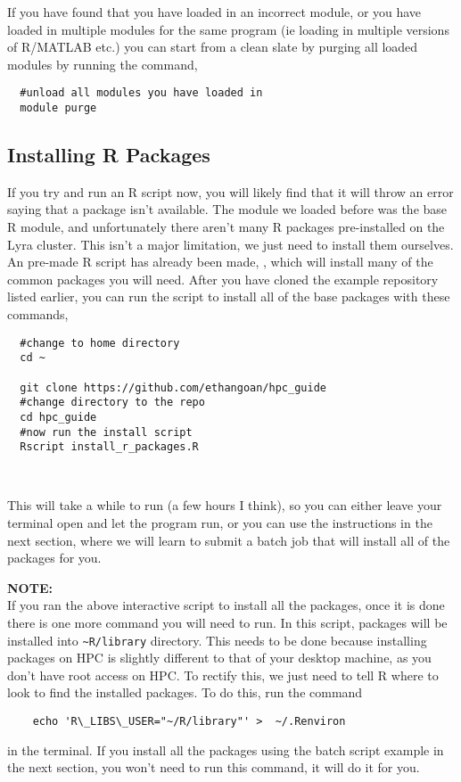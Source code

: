 If you have found that you have loaded in an incorrect module, or you have loaded in multiple modules for the same program (ie loading in multiple versions of R/MATLAB etc.) you can start from a clean slate by purging all loaded modules by running the command,
%
\\
\par
\begin{verbatim}
  #unload all modules you have loaded in
  module purge
\end{verbatim}
% 
\subsection{Installing R Packages}
\label{sec:install}
If you try and run an R script now, you will likely find that it will throw an error saying that a package isn't available. The module we loaded before was the base R module, and unfortunately there aren't many R packages pre-installed on the Lyra cluster. This isn't a major limitation, we just need to install them ourselves. An pre-made R script has already been made, , which will install many of the common packages you will need. After you have cloned the example repository listed earlier, you can run the script to install all of the base packages with these commands,
\\
\par
\begin{verbatim}
  #change to home directory
  cd ~
  
  git clone https://github.com/ethangoan/hpc_guide  
  #change directory to the repo
  cd hpc_guide
  #now run the install script
  Rscript install_r_packages.R
\end{verbatim}
%
\\
\par
% 
This will take a while to run (a few hours I think), so you can either leave your terminal open and let the program run, or you can use the instructions in the next section, where we will learn to submit a batch job that will install all of the packages for you.
%
%
\begin{story}
  \textbf{NOTE:}
  \\
  If you ran the above interactive script to install all the packages, once it is done there is one more command you will need to run. In this script, packages will be installed into \texttt{\textasciitilde R/library} directory. This needs to be done because installing packages on HPC is slightly different to that of your desktop machine, as you don't have root access on HPC. To rectify this, we just need to tell R where to look to find the installed packages. To do this, run the command
  \\
  \begin{verbatim}
    echo 'R\_LIBS\_USER="~/R/library"' >  ~/.Renviron
  \end{verbatim}
  in the terminal. If you install all the packages using the batch script example in the next section, you won't need to run this command, it will do it for you.
\end{story}
